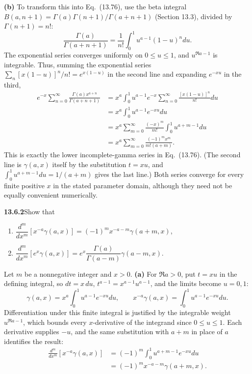 \textbf{(b)} To transform this into Eq.~(13.76), use the beta
integral $B(a,n+1)=\Gamma(a)\Gamma(n+1)/\Gamma(a+n+1)$
(Section 13.3), divided by $\Gamma(n+1)=n!$:
\[
\frac{\Gamma(a)}{\Gamma(a+n+1)}
=\frac1{n!}\int_0^1u^{a-1}(1-u)^n du.
\]
The exponential series converges uniformly on $0\le u\le1$,
and $u^{\Re a-1}$ is integrable.  Thus, summing the exponential
series $\sum_n[x(1-u)]^n/n!=e^{x(1-u)}$ in the second line and
expanding $e^{-xu}$ in the third,
\begin{align*}
e^{-x}\sum_{n=0}^{\infty}\frac{\Gamma(a)x^{a+n}}{\Gamma(a+n+1)}
&=x^a\int_0^1u^{a-1}e^{-x}
\sum_{n=0}^{\infty}\frac{[x(1-u)]^n}{n!}du\\
&=x^a\int_0^1u^{a-1}e^{-xu}du\\
&=x^a\sum_{m=0}^{\infty}\frac{(-x)^m}{m!}
\int_0^1u^{a+m-1}du\\
&=\boxed{x^a\sum_{m=0}^{\infty}\frac{(-1)^m x^m}{m!(a+m)}}.
\end{align*}
This is exactly the lower incomplete-gamma series in Eq.~(13.76).
(The second line is $\gamma(a,x)$ itself by the substitution
$t=xu$, and $\int_0^1u^{a+m-1}du=1/(a+m)$ gives the last line.)
Both series converge for every finite positive $x$ in the stated
parameter domain, although they need not be equally convenient numerically.


\par\bigskip
\noindent\textbf{13.6.2}\quad Show that
\begin{enumerate}
\item[(a)] $\dfrac{d^{m}}{dx^{m}}\left[x^{-a}\gamma(a,x)\right]
  =(-1)^{m}x^{-a-m}\gamma(a+m,x)$,
\item[(b)] $\dfrac{d^{m}}{dx^{m}}\left[e^{x}\gamma(a,x)\right]
  =e^{x}\dfrac{\Gamma(a)}{\Gamma(a-m)}\gamma(a-m,x)$.
\end{enumerate}
\par\smallskip
{}
\solution
Let $m$ be a nonnegative integer and $x>0$.
\textbf{(a)} For $\Re a>0$, put $t=xu$ in the defining integral,
so $dt=x\,du$, $t^{a-1}=x^{a-1}u^{a-1}$, and the limits become
$u=0,1$:
\[
\gamma(a,x)=x^a\int_0^1u^{a-1}e^{-xu}du,\qquad
x^{-a}\gamma(a,x)=\int_0^1u^{a-1}e^{-xu}du.
\]
Differentiation under this finite integral is justified by the
integrable weight $u^{\Re a-1}$, which bounds every
$x$-derivative of the integrand since $0\le u\le1$.  Each
derivative supplies $-u$, and the same substitution with $a+m$
in place of $a$ identifies the result:
\begin{align*}
\frac{d^m}{dx^m}[x^{-a}\gamma(a,x)]
&=(-1)^m\int_0^1u^{a+m-1}e^{-xu}du\\
&=\boxed{(-1)^mx^{-a-m}\gamma(a+m,x)}.
\end{align*}

